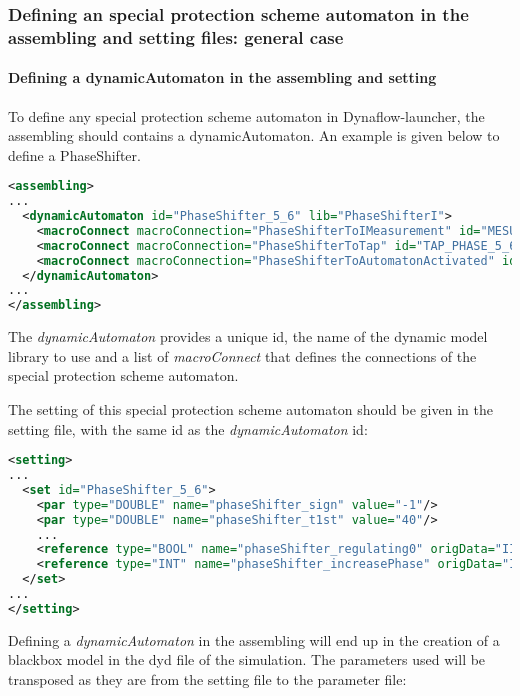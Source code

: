 \documentclass[a4paper, 12pt]{report}
\begin{document}
\subsubsection{Defining an special protection scheme automaton in the assembling and setting files: general case}
\paragraph{Defining a dynamicAutomaton in the assembling and setting\\}

To define any special protection scheme automaton in Dynaflow-launcher, the assembling should contains a dynamicAutomaton. An example is given below to define a PhaseShifter.

\begin{lstlisting}[language=XML, breaklines=true, breakatwhitespace=false, columns=fullflexible]
<assembling>
...
  <dynamicAutomaton id="PhaseShifter_5_6" lib="PhaseShifterI">
    <macroConnect macroConnection="PhaseShifterToIMeasurement" id="MESURE_I_PHASE_5_6"/>
    <macroConnect macroConnection="PhaseShifterToTap" id="TAP_PHASE_5_6"/>
    <macroConnect macroConnection="PhaseShifterToAutomatonActivated" id="AUTOMATON_EXISTS_PHASE_5_6"/>
  </dynamicAutomaton>
...
</assembling>
\end{lstlisting}

The \textit{dynamicAutomaton} provides a unique id, the name of the dynamic model library
to use and a list of \textit{macroConnect} that defines the connections of the special protection scheme automaton.

The setting of this special protection scheme automaton should be given in the setting file, with the same id as the \textit{dynamicAutomaton} id:

\begin{lstlisting}[language=XML, breaklines=true, breakatwhitespace=false, columns=fullflexible]
<setting>
...
  <set id="PhaseShifter_5_6">
    <par type="DOUBLE" name="phaseShifter_sign" value="-1"/>
    <par type="DOUBLE" name="phaseShifter_t1st" value="40"/>
    ...
    <reference type="BOOL" name="phaseShifter_regulating0" origData="IIDM" origName="regulating" componentId="_BUS____5-BUS____6-1_PS"/>
    <reference type="INT" name="phaseShifter_increasePhase" origData="IIDM" origName="increasePhase" componentId="_BUS____5-BUS____6-1_PS"/>
  </set>
...
</setting>
\end{lstlisting}


Defining a \textit{dynamicAutomaton} in the assembling will end up in the creation of a blackbox model in the dyd file of the \Dynawo simulation.
The parameters used will be transposed as they are from the setting file to the parameter file:
\end{document}
